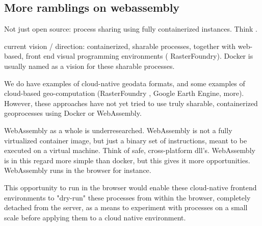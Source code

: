 


\subsection{More ramblings on webassembly}

Not just open source: process sharing using fully containerized instances. Think .

current vision / direction: containerized, sharable processes, together with web-based, front end visual programming environments ( RasterFoundry). Docker is usually named as a vision for these sharable processes.

\m{->} We do have examples of cloud-native geodata formats, and some examples of cloud-based geo-computation (RasterFoundry , Google Earth Engine, more). However, these approaches have not yet tried to use truly sharable, containerized geoprocesses using Docker or WebAssembly. 

\m{->} WebAssembly as a whole is underresearched. WebAssembly is not a fully virtualized container image, but just a binary set of instructions, meant to be executed on a virtual machine. Think of safe, cross-platform dll's. 
WebAssembly is in this regard more simple than docker, but this gives it more opportunities. 
WebAssembly runs in the browser for instance. 

\m{->} This opportunity to run in the browser would enable these cloud-native frontend environments to "dry-run" these processes from within the browser, completely detached from the server, as a means to experiment with processes on a small scale before applying them to a cloud native environment. 

